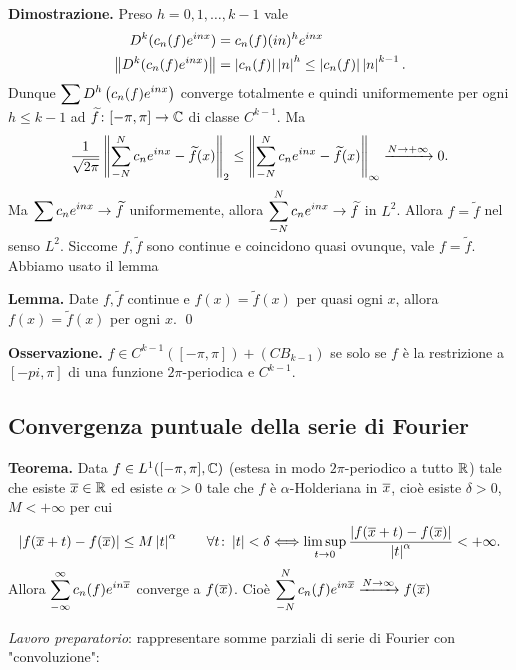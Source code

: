 \textbf{Dimostrazione.} Preso $h=0,1,\ldots,k-1$ vale
\begin{align*}
D^k (c_n(f) e^{inx}) & = c_n(f) (in)^h e^{inx} \\
\left\lVert D^k (c_n(f) e^{inx}) \right\rVert & = \left| c_n(f) \right| \left| n \right|^h \leq \left| c_n(f) \right| \left| n \right|^{k-1}.
\end{align*}
Dunque $\displaystyle \sum D^h \left( c_n(f) e^{inx} \right)$ converge totalmente e quindi uniformemente per ogni $h \leq k-1$ ad $\widetilde{f} \colon  [-\pi,\pi] \to \mathbb C$ di classe $C^{k-1}$.
Ma
%
$$
\frac{1}{\sqrt{2\pi} } \left\lVert \sum_{-N}^N c_n e^{inx} - \widetilde{f}(x) \right\rVert_2
\leq \left\lVert \sum_{-N}^N c_n e^{inx} - \widetilde{f}(x) \right\rVert_\infty \xrightarrow{N \rightarrow +\infty} 0.
$$
%
Ma $\displaystyle \sum c_n e^{inx} \to \widetilde{f}$ uniformemente, allora $\displaystyle \sum_{-N}^N c_n e^{inx} \to \widetilde{f}$ in $L^2$.
Allora $f = \tilde{f}$ nel senso $L^2$. Siccome $f,\tilde{f}$ sono continue e coincidono quasi ovunque, vale $f = \tilde{f}$.
Abbiamo usato il lemma

\vs

\textbf{Lemma.} Date $f,\tilde{f}$ continue e $f(x) = \tilde{f}(x)$ per quasi ogni $x$, allora  $f(x) = \tilde{f}(x)$ per ogni $x$.
\qed

\vs

\textbf{Osservazione.} $f \in C^{k-1}([-\pi,\pi]) + (CB_{k-1})$ se solo se $f $ è la restrizione a $[-pi,\pi]$ di una funzione $2\pi$-periodica e $C^{k-1}$.


\subsection{Convergenza puntuale della serie di Fourier}

\textbf{Teorema.} Data $f \in L^1([-\pi,\pi], \mathbb C) $ (estesa in modo $2\pi$-periodico a tutto $\mathbb R$) tale che esiste $\overline{x} \in \mathbb R$ ed esiste $\alpha > 0$ tale che $f$ è $\alpha$-Holderiana in $\overline{x}$, cioè esiste $\delta > 0 $, $M < +\infty$ per cui
%
$$
\left| f(\overline{x} +t) - f(\overline{x}) \right| \leq M \left| t \right|^\alpha \qquad \forall t \colon \left| t \right| < \delta \Longleftrightarrow \limsup_{t \to 0} \frac{\left| f(\overline{x} + t) - f(\overline{x}) \right|}{\left| t \right|^\alpha } < +\infty.
$$
%
Allora $\displaystyle \sum_{-\infty}^\infty c_n(f) e^{in\overline{x}}$ converge a $f(\overline{x})$.
Cioè $\displaystyle \sum_{-N}^N c_n(f) e^{in\overline{x}}\xrightarrow{N \to \infty} f(\overline{x})$ 

\textit{Lavoro preparatorio}: rappresentare somme parziali di serie di Fourier con "convoluzione":

